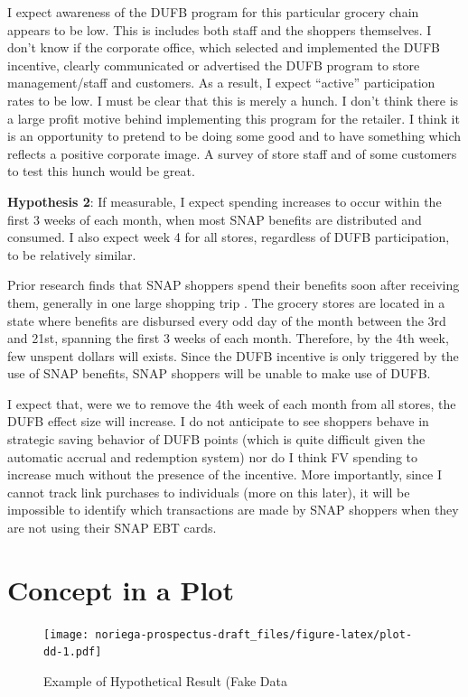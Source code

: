 \documentclass[12pt,letterpaperpaper,]{book}
\begin{document}
I expect awareness of the DUFB program for this particular grocery chain
appears to be low. This is includes both staff and the shoppers
themselves. I don't know if the corporate office, which selected and
implemented the DUFB incentive, clearly communicated or advertised the
DUFB program to store management/staff and customers. As a result, I
expect ``active'' participation rates to be low. I must be clear that
this is merely a hunch. I don't think there is a large profit motive
behind implementing this program for the retailer. I think it is an
opportunity to pretend to be doing some good and to have something which
reflects a positive corporate image. A survey of store staff and of some
customers to test this hunch would be great.

\textbf{Hypothesis 2}: If measurable, I expect spending increases to
occur within the first 3 weeks of each month, when most SNAP benefits
are distributed and consumed. I also expect week 4 for all stores,
regardless of DUFB participation, to be relatively similar.

Prior research finds that SNAP shoppers spend their benefits soon after
receiving them, generally in one large shopping trip
\citep{wiig_art_2009, damon_first_2013}. The grocery stores are located
in a state where benefits are disbursed every odd day of the month
between the 3rd and 21st, spanning the first 3 weeks of each month.
Therefore, by the 4th week, few unspent dollars will exists. Since the
DUFB incentive is only triggered by the use of SNAP benefits, SNAP
shoppers will be unable to make use of DUFB.

I expect that, were we to remove the 4th week of each month from all
stores, the DUFB effect size will increase. I do not anticipate to see
shoppers behave in strategic saving behavior of DUFB points (which is
quite difficult given the automatic accrual and redemption system) nor
do I think FV spending to increase much without the presence of the
incentive. More importantly, since I cannot track link purchases to
individuals (more on this later), it will be impossible to identify
which transactions are made by SNAP shoppers when they are not using
their SNAP EBT cards.

\section*{Concept in a Plot}\label{concept-in-a-plot}

\begin{figure}
\centering
\texttt{[image: noriega-prospectus-draft\_files/figure-latex/plot-dd-1.pdf]}
\caption{\label{fig:plot-dd}Example of Hypothetical Result (Fake Data}
\end{figure}
\end{document}
